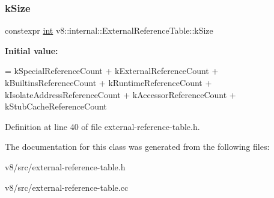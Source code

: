 \subsubsection{\texorpdfstring{k\+Size}{kSize}}
{\footnotesize\ttfamily constexpr \mbox{\hyperlink{classint}{int}} v8\+::internal\+::\+External\+Reference\+Table\+::k\+Size\hspace{0.3cm}{\ttfamily [static]}}

{\bfseries Initial value\+:}
\begin{DoxyCode}
=
      kSpecialReferenceCount + kExternalReferenceCount +
      kBuiltinsReferenceCount + kRuntimeReferenceCount +
      kIsolateAddressReferenceCount + kAccessorReferenceCount +
      kStubCacheReferenceCount
\end{DoxyCode}


Definition at line 40 of file external-\/reference-\/table.\+h.



The documentation for this class was generated from the following files\+:\begin{DoxyCompactItemize}
\item 
v8/src/external-\/reference-\/table.\+h\item 
v8/src/external-\/reference-\/table.\+cc\end{DoxyCompactItemize}
